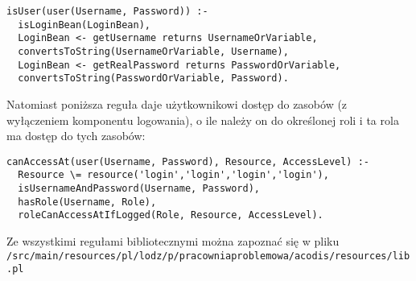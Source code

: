 \documentclass{classrep}
\begin{document}
\begin{verbatim}
isUser(user(Username, Password)) :-
  isLoginBean(LoginBean),
  LoginBean <- getUsername returns UsernameOrVariable,
  convertsToString(UsernameOrVariable, Username),
  LoginBean <- getRealPassword returns PasswordOrVariable,
  convertsToString(PasswordOrVariable, Password).
\end{verbatim}

Natomiast poniższa reguła daje użytkownikowi dostęp do zasobów (z wyłączeniem komponentu logowania), o ile należy on do określonej roli i ta rola ma dostęp do tych zasobów:

\begin{verbatim}
canAccessAt(user(Username, Password), Resource, AccessLevel) :-
  Resource \= resource('login','login','login','login'),
  isUsernameAndPassword(Username, Password),
  hasRole(Username, Role),
  roleCanAccessAtIfLogged(Role, Resource, AccessLevel).
\end{verbatim}

Ze wszystkimi regułami bibliotecznymi można zapoznać się w pliku \texttt{/src/main/}\texttt{resources/pl/lodz/p/pracowniaproblemowa/acodis/resources/lib.pl}
\end{document}

